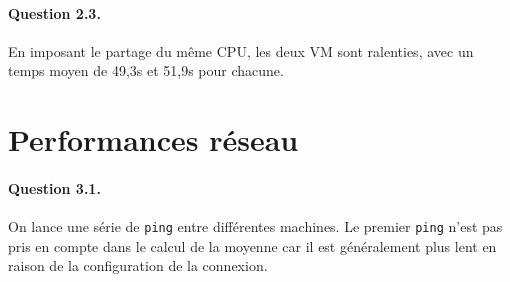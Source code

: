 \documentclass[a4paper]{article}
\begin{document}
\paragraph{Question 2.3.} En imposant le partage du même CPU, les deux VM sont ralenties, avec un temps moyen de 49,3s et 51,9s pour chacune.

\section{Performances réseau}
\paragraph{Question 3.1.} On lance une série de \texttt{ping} entre différentes machines. Le premier \texttt{ping} n'est pas pris en compte dans le calcul de la moyenne car il est généralement plus lent en raison de la configuration de la connexion.
\end{document}

